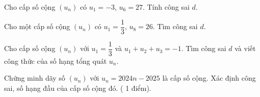 \begin{ex}%
	Cho cấp số cộng $\left(u_{n}\right)$ có $u_{1}=-3$, $u_{6}=27$. Tính công sai $d$. 
\end{ex}

\begin{ex}%
	Cho một  cấp số cộng $\left(u_{n}\right)$ có $u_{1}=\dfrac{1}{3}$, $u_{8}=26$. Tìm công sai $d$.
\end{ex}

\begin{ex}%
	Cho cấp số cộng $(u_n)$ với ${u_1=\dfrac{1}{3}}$ và ${u_1+u_2+u_3=-1}$. Tìm công sai $d$ và viết công  thức của số hạng tổng quát $u_n$.
\end{ex}

\begin{bt}%

	Chứng minh dãy số $\left(u_n\right)$ với $u_n=2024n-2025$ là cấp số cộng. Xác định công sai, số hạng đầu của cấp số cộng đó.
	( 1 điểm).
\end{bt}

